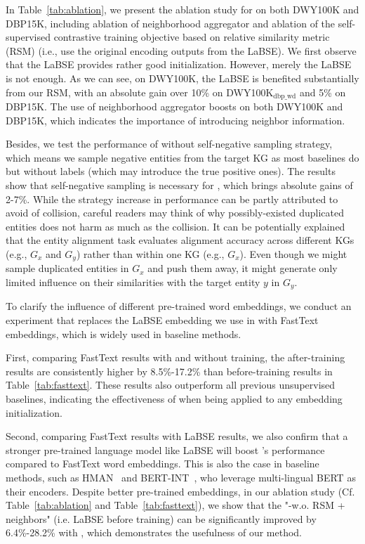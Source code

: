 In Table~\ref{tab:ablation}, we present the ablation study for \solution on both DWY100K and DBP15K, including ablation of neighborhood aggregator and ablation of the self-supervised contrastive training objective based on relative similarity metric (RSM) (i.e., use the original encoding outputs from the LaBSE). We first observe that the LaBSE provides rather good initialization. However, merely the LaBSE is not enough. As we can see, on DWY100K, the LaBSE is benefited substantially from our RSM, with an absolute gain over 10\% on DWY100K$_{\text{dbp\_wd}}$ and 5\% on DBP15K. The use of neighborhood aggregator boosts \solution on both DWY100K and DBP15K, which indicates the importance of introducing neighbor information. 

Besides, we test the performance of \solution without self-negative sampling strategy, which means we sample negative entities from the target KG as most baselines do but without labels (which may introduce the true positive ones). The results show that self-negative sampling is necessary for \solution, which brings absolute gains of 2-7\%. While the strategy increase in performance can be partly attributed to avoid of collision, careful readers may think of why possibly-existed duplicated entities does not harm as much as the collision. It can be potentially explained that the entity alignment task evaluates alignment accuracy across different KGs (e.g., $G_x$ and $G_y$) rather than within one KG (e.g., $G_x$). Even though we might sample duplicated entities in $G_x$ and push them away, it might generate only limited influence on their similarities with the target entity $y$ in $G_y$.

To clarify the influence of different pre-trained word embeddings, we conduct an experiment that replaces the LaBSE embedding we use in \solution with FastText embeddings, which is widely used in baseline methods.

First, comparing FastText results with and without training, the after-training results are consistently higher by 8.5\%-17.2\% than before-training results in Table~\ref{tab:fasttext}. These results also outperform all previous unsupervised baselines, indicating the effectiveness of \solution when being applied to any embedding initialization.

Second, comparing FastText results with LaBSE results, we also confirm that a stronger pre-trained language model like LaBSE will boost \solution's performance compared to FastText word embeddings. This is also the case in baseline methods, such as HMAN~\cite{yang2019aligning} and BERT-INT~\cite{tang2019bert-int}, who leverage multi-lingual BERT as their encoders. Despite better pre-trained embeddings, in our ablation study (Cf. Table~\ref{tab:ablation} and Table~\ref{tab:fasttext}), we show that the "-w.o. RSM + neighbors" (i.e. LaBSE before \solution training) can be significantly improved by 6.4\%-28.2\% with \solution, which demonstrates the usefulness of our method.

